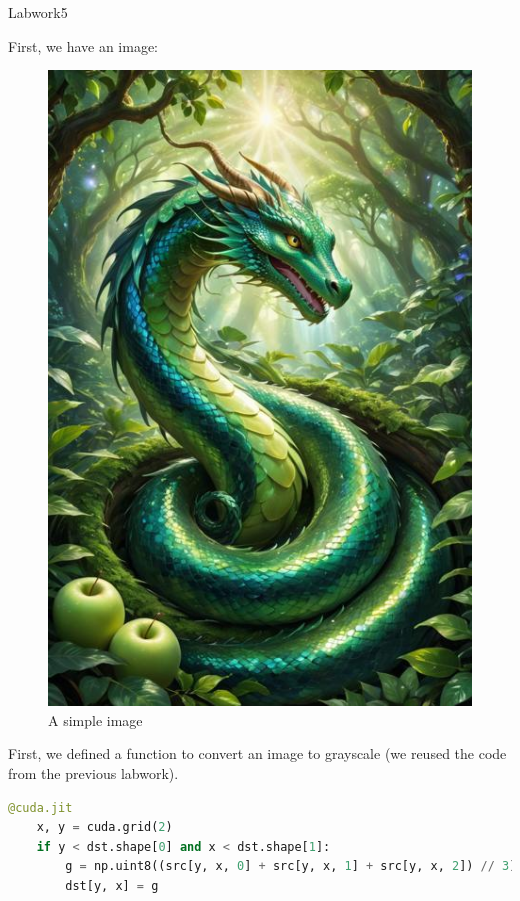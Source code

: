 \documentclass[12pt]{article}
\begin{document}
\begin{center}
    \vspace*{1.8cm}
    \Large
    Labwork5\\
\end{center}

\noindent
First, we have an image:
\begin{figure}[H]
\centering
    \includegraphics[height = 0.5\textheight, keepaspectratio]{images/image.jpeg}
    \caption{A simple image}
\end{figure}


\noindent
First, we defined a function to convert an image to grayscale (we reused the code from the previous labwork).

\begin{lstlisting}[language=Python]
@cuda.jit
    x, y = cuda.grid(2)
    if y < dst.shape[0] and x < dst.shape[1]:
        g = np.uint8((src[y, x, 0] + src[y, x, 1] + src[y, x, 2]) // 3)
        dst[y, x] = g
\end{lstlisting}
\end{document}
